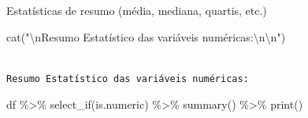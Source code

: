 \documentclass[
  letterpaper,
  DIV=11,
  numbers=noendperiod]{scrartcl}
\newenvironment{Shaded}{\begin{snugshade}}{\end{snugshade}}
\newcommand{\FunctionTok}[1]{\textcolor[rgb]{0.28,0.35,0.67}{#1}}
\newcommand{\NormalTok}[1]{\textcolor[rgb]{0.00,0.23,0.31}{#1}}
\newcommand{\SpecialCharTok}[1]{\textcolor[rgb]{0.37,0.37,0.37}{#1}}
\newcommand{\StringTok}[1]{\textcolor[rgb]{0.13,0.47,0.30}{#1}}
\begin{document}
Estatísticas de resumo (média, mediana, quartis, etc.)

\begin{Shaded}
\begin{Highlighting}[]
\FunctionTok{cat}\NormalTok{(}\StringTok{"}\SpecialCharTok{\textbackslash{}n}\StringTok{Resumo Estatístico das variáveis numéricas:}\SpecialCharTok{\textbackslash{}n\textbackslash{}n}\StringTok{"}\NormalTok{)}
\end{Highlighting}
\end{Shaded}

\begin{verbatim}

Resumo Estatístico das variáveis numéricas:
\end{verbatim}

\begin{Shaded}
\begin{Highlighting}[]
\NormalTok{df }\SpecialCharTok{\%\textgreater{}\%}
  \FunctionTok{select\_if}\NormalTok{(is.numeric) }\SpecialCharTok{\%\textgreater{}\%}
  \FunctionTok{summary}\NormalTok{() }\SpecialCharTok{\%\textgreater{}\%}
  \FunctionTok{print}\NormalTok{()}
\end{Highlighting}
\end{Shaded}
\end{document}
